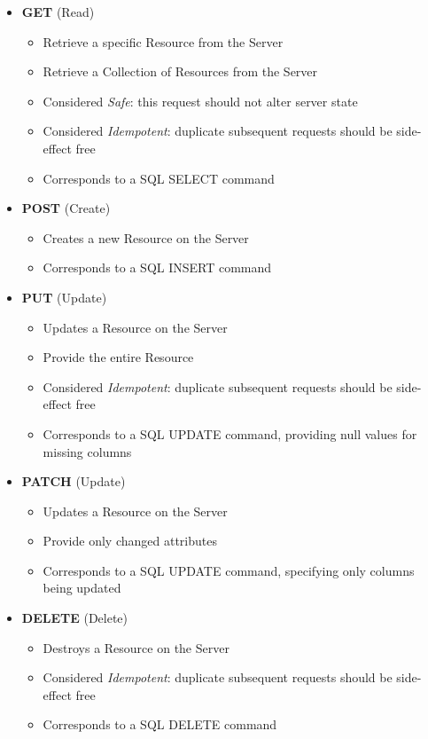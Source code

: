 \begin{itemize}
\item \textbf{GET} (Read)
    \begin{itemize}
    \item Retrieve a specific Resource from the Server
    \item Retrieve a Collection of Resources from the Server
    \item Considered \emph{Safe}: this request should not alter server state
    \item Considered \emph{Idempotent}: duplicate subsequent requests should be side-effect free
    \item Corresponds to a SQL SELECT command
    \end{itemize}
\item \textbf{POST} (Create)
    \begin{itemize}
    \item Creates a new Resource on the Server
    \item Corresponds to a SQL INSERT command
    \end{itemize}
\item \textbf{PUT} (Update)
    \begin{itemize}
    \item Updates a Resource on the Server
    \item Provide the entire Resource
    \item Considered \emph{Idempotent}: duplicate subsequent requests should be side-effect free
    \item Corresponds to a SQL UPDATE command, providing null values for missing columns
    \end{itemize}
\item \textbf{PATCH} (Update)
    \begin{itemize}
    \item Updates a Resource on the Server
    \item Provide only changed attributes
    \item Corresponds to a SQL UPDATE command, specifying only columns being updated
    \end{itemize}
\item \textbf{DELETE} (Delete)
    \begin{itemize}
    \item Destroys a Resource on the Server
    \item Considered \emph{Idempotent}: duplicate subsequent requests should be side-effect free
    \item Corresponds to a SQL DELETE command
    \end{itemize}
\end{itemize}

